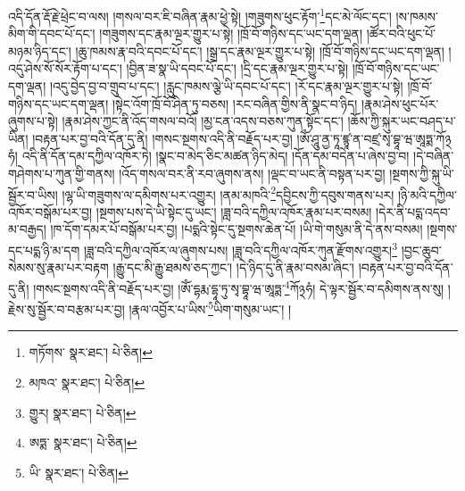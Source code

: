 འདི་དོན་རྡོ་རྗེ་ཕྲེང་བ་ལས། །གསལ་བར་ཇི་བཞིན་རྣམ་ཕྱེ་སྟེ། །གཟུགས་ཕུང་རྟོག་\footnote{གཏོགས་  སྣར་ཐང་།  པེ་ཅིན། }དང་མེ་ལོང་དང་། །ས་ཁམས་མིག་གི་དབང་པོ་དང་། །གཟུགས་དང་རྣམ་ལྔར་གྱུར་པ་སྟེ། །ཁྲོ་བོ་གཉིས་དང་ཡང་དག་ལྡན། །ཚོར་བའི་ཕུང་པོ་མཉམ་ཉིད་དང་། །ཆུ་ཁམས་རྣ་བའི་དབང་པོ་དང་། །སྒྲ་དང་རྣམ་ལྔར་གྱུར་པ་སྟེ། །ཁྲོ་བོ་གཉིས་དང་ཡང་དག་ལྡན། །འདུ་ཤེས་སོ་སོར་རྟོག་པ་དང་། །བྱིན་ཟ་སྣ་ཡི་དབང་པོ་དང་། །དྲི་དང་རྣམ་ལྔར་གྱུར་པ་སྟེ། །ཁྲོ་བོ་གཉིས་དང་ཡང་དག་ལྡན། །འདུ་བྱེད་བྱ་བ་གྲུབ་པ་དང་། །རླུང་ཁམས་ལྕེ་ཡི་དབང་པོ་དང་། །རོ་དང་རྣམ་ལྔར་གྱུར་པ་སྟེ། །ཁྲོ་བོ་གཉིས་དང་ཡང་དག་ལྡན། །སྟེང་འོག་ཁྲོ་བོ་ཤིན་ཏུ་བཅས། །རང་བཞིན་གྱིས་ནི་སྣང་བ་ཉིད། །རྣམ་ཤེས་ཕུང་པོར་ཞུགས་པ་སྟེ། །རྣམ་ཤེས་ཀྱང་ནི་འོད་གསལ་བའོ། །མྱ་ངན་འདས་བཅས་ཀུན་སྟོང་དང་། །ཆོས་ཀྱི་སྐུར་ཡང་བཤད་པ་ཡིན། །བརྟན་པར་བྱ་བའི་དོན་དུ་ནི། །གསང་སྔགས་འདི་ནི་བརྗོད་པར་བྱ། །ཨོཾ་ཤཱུ་ནྱ་ཏཱ་ཛྙཱ་ན་བཛྲ་སྭ་བྷཱ་ཝ་ཨཱཏྨ་ཀོ྅ཧཾ། འདི་ནི་དོན་དམ་དཀྱིལ་འཁོར་ཏེ། །སྣང་བ་མེད་ཅིང་མཚན་ཉིད་མེད། །དོན་དམ་བདེན་པ་ཞེས་བྱ་བ། །དེ་བཞིན་གཤེགས་པ་ཀུན་གྱི་གནས། །འོད་གསལ་བར་ནི་རབ་ཞུགས་ནས། །ལྡང་བ་ཡང་ནི་བསྟན་པར་བྱ། །སྔགས་ཀྱི་སྐུ་ཡི་སྦྱོར་བ་ཡིས། །ལྷ་ཡི་གཟུགས་ལ་དམིགས་པར་འགྱུར། །ནམ་མཁའི་\footnote{མཁའ་  སྣར་ཐང་།  པེ་ཅིན། }དབྱིངས་ཀྱི་དབུས་གནས་པར། །ཉི་མའི་དཀྱིལ་འཁོར་བསྒོམ་པར་བྱ། །སྔགས་པས་དེ་ཡི་སྟེང་དུ་ཡང་། །ཟླ་བའི་དཀྱིལ་འཁོར་རྣམ་པར་བསམ། །དེར་ནི་པདྨ་འདབ་མ་བརྒྱད། །ཁ་དོག་དམར་པོ་བསྒོམ་པར་བྱ། །པདྨའི་སྟེང་དུ་སྔགས་ཆེན་པོ། །ཡི་གེ་གསུམ་ནི་དེ་ནས་བསམ། །སྔགས་དང་པདྨ་ཉི་མ་དག །ཟླ་བའི་དཀྱིལ་འཁོར་ལ་ཞུགས་པས། །ཟླ་བའི་དཀྱིལ་འཁོར་ཀུན་རྫོགས་འགྱུར།\footnote{གྱུར།  སྣར་ཐང་།  པེ་ཅིན། } །བྱང་ཆུབ་སེམས་སུ་རྣམ་པར་བརྟག །རྒྱུ་དང་མི་རྒྱུ་ཐམས་ཅད་ཀྱང་། །དེ་ཉིད་དུ་ནི་རྣམ་བསམ་ཞིང་། །བརྟན་པར་བྱ་བའི་དོན་དུ་ནི། །གསང་སྔགས་འདི་ནི་བརྗོད་པར་བྱ། །ཨོཾ་དྷརྨ་དྷཱ་ཏུ་སྭ་བྷཱ་ཝ་ཨཱཏྨ་\footnote{ཨཏྨ་  སྣར་ཐང་།  པེ་ཅིན། }ཀོ྅ཧཾ། དེ་ལྟར་སྦྱོར་བ་དམིགས་ནས་སུ། །རྗེས་སུ་སྦྱོར་བ་བརྩམ་པར་བྱ། །རྣལ་འབྱོར་པ་ཡིས་\footnote{ཡི་  སྣར་ཐང་།  པེ་ཅིན། }ཡིག་གསུམ་ཡང་། །
